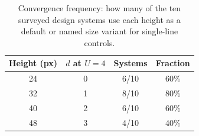 \begin{table}[ht]
\centering
\caption{Convergence frequency: how many of the ten surveyed design systems use each height as a default or named size variant for single-line controls.}
\label{tab:convergence}
\begin{tabular}{cccc}
\toprule
Height (px) & $d$ at $U{=}4$ & Systems & Fraction \\
\midrule
24  & 0   & 6/10  & 60\% \\
32  & 1   & 8/10  & 80\% \\
40  & 2   & 6/10  & 60\% \\
48  & 3   & 4/10  & 40\% \\
\bottomrule
\end{tabular}
\end{table}

